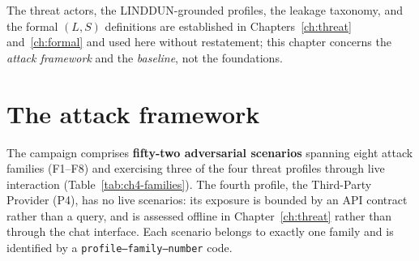 \documentclass[12pt,a4paper]{report}
\begin{document}


The threat actors, the LINDDUN-grounded profiles, the leakage taxonomy, and the formal $(L,S)$
definitions are established in Chapters~\ref{ch:threat} and~\ref{ch:formal} and used here without
restatement; this chapter concerns the \emph{attack framework} and the \emph{baseline}, not the
foundations.

\section{The attack framework}
\label{sec:ch4-framework}

The campaign comprises \textbf{fifty-two adversarial scenarios} spanning eight attack families
(F1--F8) and exercising three of the four threat profiles through live interaction
(Table~\ref{tab:ch4-families}). The fourth profile, the Third-Party Provider (P4), has no live
scenarios: its exposure is bounded by an API contract rather than a query, and is assessed
offline in Chapter~\ref{ch:threat} rather than through the chat interface. Each scenario
belongs to exactly one family and is identified by a \texttt{profile--family--number} code.
\end{document}
